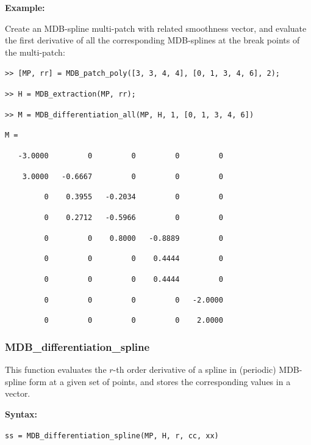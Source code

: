 \documentclass[10pt]{./acmtrans2e}
\newcommand{\syntax}[1]{\medskip
\noindent \textbf{Syntax:} \medskip

\texttt{#1}
}
\newenvironment{example}
{\vspace*{0.1cm}
\noindent \textbf{Example:} \vspace*{0.15cm}

\setlength{\parskip}{0.5ex plus 0.5exminus 0.2 ex}
}
{\medskip
}
\begin{document}
\begin{example}
\noindent Create an MDB-spline multi-patch with related smoothness vector, and evaluate the first derivative of all the corresponding MDB-splines at the break points of the multi-patch:
\medskip

\texttt{>> [MP, rr] = MDB\_patch\_poly([3, 3, 4, 4], [0, 1, 3, 4, 6], 2);}

\texttt{>> H = MDB\_extraction(MP, rr);}

\texttt{>> M = MDB\_differentiation\_all(MP, H, 1, [0, 1, 3, 4, 6])}

\texttt{M =}

\texttt{\ \ \ -3.0000\ \ \ \ \ \ \ \ \ 0\ \ \ \ \ \ \ \ \ 0\ \ \ \ \ \ \ \ \ 0\ \ \ \ \ \ \ \ \ 0}

\texttt{\ \ \ \ 3.0000\ \ \ -0.6667\ \ \ \ \ \ \ \ \ 0\ \ \ \ \ \ \ \ \ 0\ \ \ \ \ \ \ \ \ 0}

\texttt{\ \ \ \ \ \ \ \ \ 0\ \ \ \ 0.3955\ \ \ -0.2034\ \ \ \ \ \ \ \ \ 0\ \ \ \ \ \ \ \ \ 0}

\texttt{\ \ \ \ \ \ \ \ \ 0\ \ \ \ 0.2712\ \ \ -0.5966\ \ \ \ \ \ \ \ \ 0\ \ \ \ \ \ \ \ \ 0}

\texttt{\ \ \ \ \ \ \ \ \ 0\ \ \ \ \ \ \ \ \ 0\ \ \ \ 0.8000\ \ \ -0.8889\ \ \ \ \ \ \ \ \ 0}

\texttt{\ \ \ \ \ \ \ \ \ 0\ \ \ \ \ \ \ \ \ 0\ \ \ \ \ \ \ \ \ 0\ \ \ \ 0.4444\ \ \ \ \ \ \ \ \ 0}

\texttt{\ \ \ \ \ \ \ \ \ 0\ \ \ \ \ \ \ \ \ 0\ \ \ \ \ \ \ \ \ 0\ \ \ \ 0.4444\ \ \ \ \ \ \ \ \ 0}

\texttt{\ \ \ \ \ \ \ \ \ 0\ \ \ \ \ \ \ \ \ 0\ \ \ \ \ \ \ \ \ 0\ \ \ \ \ \ \ \ \ 0\ \ \ -2.0000}

\texttt{\ \ \ \ \ \ \ \ \ 0\ \ \ \ \ \ \ \ \ 0\ \ \ \ \ \ \ \ \ 0\ \ \ \ \ \ \ \ \ 0\ \ \ \ 2.0000}
\end{example}


\subsubsection{MDB\_differentiation\_spline} \label{sec:matlab-mdb-differentiation-spline}

This function evaluates the $r$-th order derivative of a spline in (periodic) MDB-spline form at a given set of points, and stores the corresponding values in a vector.

\syntax{ss = MDB\_differentiation\_spline(MP, H, r, cc, xx)}
\end{document}
